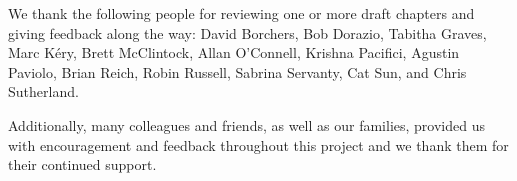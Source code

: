 We thank the following people for reviewing one or more draft chapters
and giving feedback along the way:
David Borchers,
Bob Dorazio,
Tabitha Graves,
Marc K\'{e}ry,   %
Brett McClintock,
Allan O'Connell,
Krishna Pacifici,
Agustin Paviolo,
Brian Reich,
Robin Russell,
Sabrina Servanty,
Cat Sun,
and
Chris Sutherland.


Additionally, many colleagues and friends, as well as our families, provided us with encouragement and 
feedback throughout this project and
we thank them for their continued support.